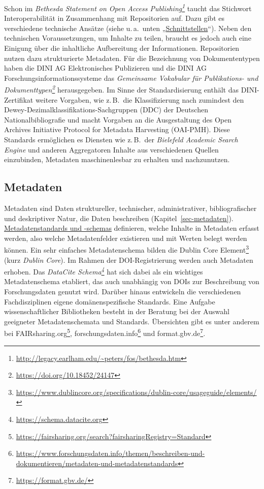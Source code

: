 \documentclass[
  11pt,
  letterpaper,
  DIV=11,
  twoside]{scrreprt}
\DeclareRobustCommand{\href}[2]{#2\footnote{\url{#1}}}
\begin{document}
Schon im
\emph{\href{http://legacy.earlham.edu/~peters/fos/bethesda.htm}{Bethesda
Statement on Open Access Publishing}} taucht das Stichwort
Interoperabilität in Zusammenhang mit Repositorien auf. Dazu gibt es
verschiedene technische Ansätze (siehe u.\,a.~unten
„\hyperref[schnittstellen]{Schnittstellen}``). Neben den technischen
Voraussetzungen, um Inhalte zu teilen, braucht es jedoch auch eine
Einigung über die inhaltliche Aufbereitung der Informationen.
Repositorien nutzen dazu strukturierte Metadaten. Für die Bezeichnung
von Dokumententypen haben die DINI AG Elektronisches Publizieren und die
DINI AG Forschungsinformationssysteme das
\emph{\href{https://doi.org/10.18452/24147}{Gemeinsame Vokabular für
Publikations- und Dokumenttypen}} herausgegeben. Im Sinne der
Standardisierung enthält das DINI-Zertifikat weitere Vorgaben, wie
z.\,B.~die Klassifizierung nach zumindest den
Dewey-Dezimalklassifikations-Sachgruppen ({DDC}) der Deutschen
Nationalbibliografie und macht Vorgaben an die Ausgestaltung des Open
Archives Initiative Protocol for Metadata Harvesting ({OAI-PMH}). Diese
Standards ermöglichen es Diensten wie z.\,B.~der \emph{Bielefeld
Academic Search Engine} und anderen Aggregatoren Inhalte aus
verschiedenen Quellen einzubinden, Metadaten maschinenlesbar zu erhalten
und nachzunutzen.

\subsection{Metadaten}\label{metadaten}

Metadaten sind Daten struktureller, technischer, administrativer,
bibliografischer und deskriptiver Natur, die Daten beschreiben
(Kapitel~\ref{sec-metadaten}).
\hyperref[metadatenstandards]{Metadatenstandards und -schemas}
definieren, welche Inhalte in Metadaten erfasst werden, also welche
Metadatenfelder existieren und mit Werten belegt werden können. Ein sehr
einfaches Metadatenschema bilden die
\href{https://www.dublincore.org/specifications/dublin-core/usageguide/elements/}{Dublin
Core Element} (kurz \emph{Dublin Core}). Im Rahmen der DOI-Registrierung
werden auch Metadaten erhoben. Das
\emph{\href{https://schema.datacite.org}{DataCite Schema}} hat sich
dabei als ein wichtiges Metadatenschema etabliert, das auch unabhängig
von DOIs zur Beschreibung von Forschungsdaten genutzt wird. Darüber
hinaus entwickeln die verschiedenen Fachdisziplinen eigene
domänenspezifische Standards. Eine Aufgabe wissenschaftlicher
Bibliotheken besteht in der Beratung bei der Auswahl geeigneter
Metadatenschemata und Standards. Übersichten gibt es unter anderem bei
\href{https://fairsharing.org/search?fairsharingRegistry=Standard}{FAIRsharing.org},
\href{https://www.forschungsdaten.info/themen/beschreiben-und-dokumentieren/metadaten-und-metadatenstandards}{forschungsdaten.info}
und \href{https://format.gbv.de/}{format.gbv.de}.
\end{document}
